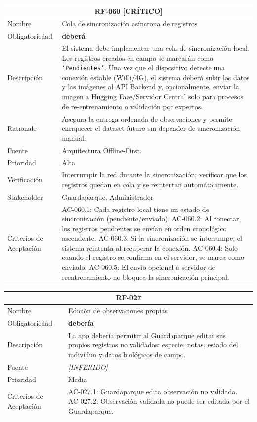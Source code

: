 \documentclass[12pt, a4paper]{article}
\newcommand{\criticomark}{\textcolor{criticolor}{\textbf{[CR\'ITICO]}}}
\newcommand{\inferido}{\textcolor{medio}{\textit{[INFERIDO]}}}
\begin{document}
\begin{longtable}{|p{3cm}|p{11.5cm}|}
\hline
\multicolumn{2}{|c|}{\textbf{RF-060} \criticomark} \\
\hline
Nombre & Cola de sincronización asíncrona de registros \\
\hline
Obligatoriedad & \textbf{deberá} \\
\hline
Descripción & El sistema debe implementar una cola de sincronización local. Los registros creados en campo se marcarán como \texttt{‘Pendientes’}. Una vez que el dispositivo detecte una conexión estable (WiFi/4G), el sistema deberá subir los datos y las imágenes al API Backend y, opcionalmente, enviar la imagen a Hugging Face/Servidor Central solo para procesos de re-entrenamiento o validación por expertos. \\
\hline
Rationale & Asegura la entrega ordenada de observaciones y permite enriquecer el dataset futuro sin depender de sincronización manual. \\
\hline
Fuente & Arquitectura Offline-First. \\
\hline
Prioridad & Alta \\
\hline
Verificación & Interrumpir la red durante la sincronización; verificar que los registros quedan en cola y se reintentan automáticamente. \\
\hline
Stakeholder & Guardaparque, Administrador \\
\hline
Criterios de Aceptación &
AC-060.1: Cada registro local tiene un estado de sincronización (pendiente/enviado). \newline
AC-060.2: Al conectar, los registros pendientes se envían en orden cronológico ascendente. \newline
AC-060.3: Si la sincronización se interrumpe, el sistema reintenta al recuperar la conexión. \newline
AC-060.4: Solo cuando el registro se confirma en el servidor, se marca como enviado. \newline
AC-060.5: El envío opcional a servidor de reentrenamiento no bloquea la sincronización principal. \\
\hline
\end{longtable}

\begin{longtable}{|p{3cm}|p{11.5cm}|}
\hline
\multicolumn{2}{|c|}{\textbf{RF-027}} \\
\hline
Nombre & Edici\'on de observaciones propias \\
\hline
Obligatoriedad & \textbf{deber\'ia} \\
\hline
Descripci\'on & La app deber\'ia permitir al Guardaparque editar sus propios registros no validados: especie, notas, estado del individuo y datos biol\'ogicos de campo. \\
\hline
Fuente & \inferido{} \\
\hline
Prioridad & Media \\
\hline
Criterios de Aceptaci\'on &
AC-027.1: Guardaparque edita observaci\'on no validada. \newline
AC-027.2: Observaci\'on validada no puede ser editada por el Guardaparque. \\
\hline
\end{longtable}
\end{document}
